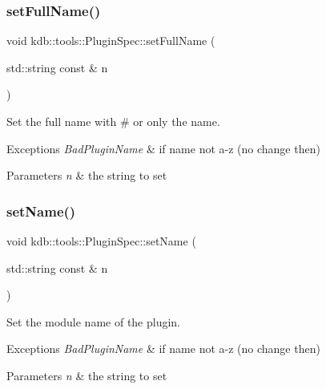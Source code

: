 \subsubsection{\texorpdfstring{set\+Full\+Name()}{setFullName()}}
{\footnotesize\ttfamily void kdb\+::tools\+::\+Plugin\+Spec\+::set\+Full\+Name (\begin{DoxyParamCaption}\item[{std\+::string const \&}]{n }\end{DoxyParamCaption})}



Set the full name with \# or only the name. 


\begin{DoxyExceptions}{Exceptions}
{\em Bad\+Plugin\+Name} & if name not a-\/z (no change then)\\
\hline
\end{DoxyExceptions}

\begin{DoxyParams}{Parameters}
{\em n} & the string to set \\
\hline
\end{DoxyParams}
\mbox{\label{classkdb_1_1tools_1_1PluginSpec_a9b3ade491bab63a6472f9885d2fee1e9}} 
\subsubsection{\texorpdfstring{set\+Name()}{setName()}}
{\footnotesize\ttfamily void kdb\+::tools\+::\+Plugin\+Spec\+::set\+Name (\begin{DoxyParamCaption}\item[{std\+::string const \&}]{n }\end{DoxyParamCaption})}



Set the module name of the plugin. 


\begin{DoxyExceptions}{Exceptions}
{\em Bad\+Plugin\+Name} & if name not a-\/z (no change then)\\
\hline
\end{DoxyExceptions}

\begin{DoxyParams}{Parameters}
{\em n} & the string to set \\
\hline
\end{DoxyParams}
\mbox{\label{classkdb_1_1tools_1_1PluginSpec_a52b63e5cc6f15be122b6fdb83b3079ed}} 
